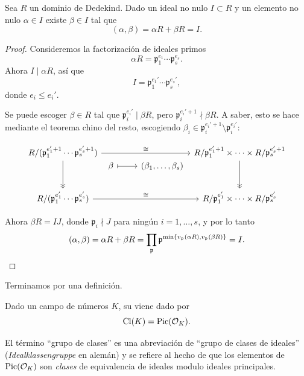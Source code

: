 \begin{proposicion}
  Sea $R$ un dominio de Dedekind. Dado un ideal no nulo $I \subset R$ y un
  elemento no nulo $\alpha \in I$ existe $\beta \in I$ tal que
  $$(\alpha,\beta) = \alpha R + \beta R = I.$$

  \begin{proof}
    Consideremos la factorización de ideales primos
    $$\alpha R = \mathfrak{p}_1^{e_1}\cdots\mathfrak{p}_s^{e_s}.$$
    Ahora $I \mid \alpha R$, así que
    $$I = \mathfrak{p}_1^{e_1'}\cdots \mathfrak{p}_s^{e_s'},$$
    donde $e_i \le e_i'$.

    Se puede escoger $\beta \in R$ tal que $\mathfrak{p}_i^{e_i'} \mid \beta R$,
    pero $\mathfrak{p}_i^{e_i' + 1} \nmid \beta R$. A saber, esto se hace
    mediante el teorema chino del resto, escogiendo
    $\beta_i \in \mathfrak{p}_i^{e_i'+1}\setminus\mathfrak{p}_i^{e_i'}$:

    \[ \begin{tikzcd}
      R/(\mathfrak{p}_1^{e_1'+1}\cdots\mathfrak{p}_s^{e_s'+1}) \ar{rrr}{\cong}\ar[->>]{dd} &[-2em] &&[-2em]
      R/\mathfrak{p}_1^{e_1'+1}\times\cdots\times R/\mathfrak{p}_s^{e_s'+1} \ar[->>]{dd} \\[-2em]
      & \beta \ar[|->]{r} & (\beta_1, \ldots, \beta_s) \\
      R/(\mathfrak{p}_1^{e_1'}\cdots\mathfrak{p}_s^{e_s'}) \ar{rrr}{\cong} &&&
      R/\mathfrak{p}_1^{e_1'}\times\cdots\times R/\mathfrak{p}_s^{e_s'}
    \end{tikzcd} \]

    Ahora $\beta R = IJ$, donde $\mathfrak{p}_i \nmid J$ para ningún
    $i = 1,\ldots,s$, y por lo tanto
    \[ (\alpha,\beta) =
       \alpha R + \beta R =
       \prod_\mathfrak{p}
         \mathfrak{p}^{\min \{ v_\mathfrak{p} (\alpha R), v_\mathfrak{p} (\beta R) \}}
       = I. \qedhere \]
  \end{proof}
\end{proposicion}

Terminamos por una definición.

\begin{definicion}
  Dado un campo de números $K$, su  viene dado por
  $$\operatorname{Cl} (K) = \operatorname{Pic} (\mathcal{O}_K).$$
\end{definicion}

El término ``grupo de clases'' es una abreviación de ``grupo de clases
de ideales'' (\emph{Idealklassengruppe} en alemán) y se refiere al hecho de que
los elementos de $\operatorname{Pic} (\mathcal{O}_K)$ son \emph{clases} de equivalencia de ideales
modulo ideales principales.

